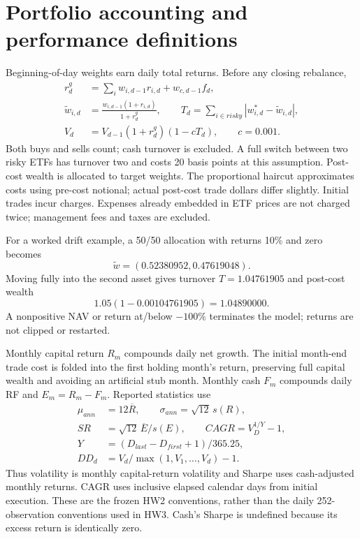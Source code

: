 \documentclass[11pt]{article}
\begin{document}
\section{Portfolio accounting and performance definitions}
Beginning-of-day weights earn daily total returns. Before any closing rebalance,
\begin{align}
r_d^g&=\sum_i w_{i,d-1}r_{i,d}+w_{c,d-1}f_d,\\
\widetilde w_{i,d}&=\frac{w_{i,d-1}(1+r_{i,d})}{1+r_d^g},\qquad
T_d=\sum_{i\in risky}|w^*_{i,d}-\widetilde w_{i,d}|,\\
V_d&=V_{d-1}(1+r_d^g)(1-cT_d),\qquad c=0.001.
\end{align}
Both buys and sells count; cash turnover is excluded. A full switch between two risky ETFs has turnover two and costs 20 basis points at this assumption. Post-cost wealth is allocated to target weights. The proportional haircut approximates costs using pre-cost notional; actual post-cost trade dollars differ slightly. Initial trades incur charges. Expenses already embedded in ETF prices are not charged twice; management fees and taxes are excluded.

For a worked drift example, a 50/50 allocation with returns 10\% and zero becomes\[\widetilde w=(0.52380952,0.47619048).\]Moving fully into the second asset gives turnover $T=1.04761905$ and post-cost wealth\[1.05(1-0.00104761905)=1.04890000.\]A nonpositive NAV or return at/below $-100\%$ terminates the model; returns are not clipped or restarted.

Monthly capital return $R_m$ compounds daily net growth. The initial month-end trade cost is folded into the first holding month's return, preserving full capital wealth and avoiding an artificial stub month. Monthly cash $F_m$ compounds daily RF and $E_m=R_m-F_m$. Reported statistics use
\begin{align}
\mu_{ann}&=12\overline R,\qquad \sigma_{ann}=\sqrt{12}\,s(R),\\
SR&=\sqrt{12}\,\overline E/s(E),\qquad
CAGR=V_D^{1/Y}-1,\\
Y&=(D_{last}-D_{first}+1)/365.25,\\
DD_d&=V_d/\max(1,V_1,\ldots,V_d)-1.
\end{align}
Thus volatility is monthly capital-return volatility and Sharpe uses cash-adjusted monthly returns. CAGR uses inclusive elapsed calendar days from initial execution. These are the frozen HW2 conventions, rather than the daily 252-observation conventions used in HW3. Cash's Sharpe is undefined because its excess return is identically zero.
\end{document}
